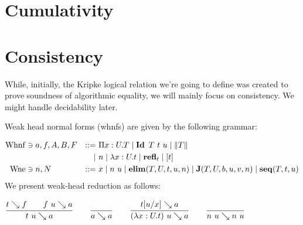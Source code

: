 \documentclass[a4paper,english]{lipics-utf8x}
\begin{document}
  \begin{mathc}
  \end{mathc}

  \section{Cumulativity}

  \begin{mathc}
    \qquad
  \end{mathc}

  \begin{mathc}
    \qquad
  \end{mathc}

  \section{Consistency}

  While, initially, the Kripke logical relation we're going to define was
  created to prove soundness of algorithmic equality, we will mainly focus
  on consistency. We might handle decidability later.


  Weak head normal forms (whnfs) are given by the following grammar:

  \begin{align*}
    \operatorname{Whnf} &\ni a,f,A,B,F &::=~& \Pi x:U.T \mid \operatorname{\mathbf{Id}~} T\ t\ u \mid \|T\| \\
        &&\mid~& n \mid \lambda x:U.t \mid \operatorname{\mathbf{refl}}_t \mid [t] \\
    \operatorname{Wne}  &\ni n,N &::=~& x \mid n~u \mid \operatorname{\mathbf{elim}}(T,U,t,u,n) \mid \operatorname{\mathbf{J}} (T,U,b,u,v,n)
                    \mid \operatorname{\mathbf{seq}}(T,t,u)
  \end{align*}
  We present weak-head reduction as follows:

  \begin{center}
  \(
    \ru{t \rew f \qquad
        f~u \rew a
      }{t~u \rew a}
    \qquad
    \ru{}{a \rew a}
    \qquad
    \ru{t[u/x] \rew a
      }{(\lambda x:U.t)~u \rew a}
    \qquad
    \ru{}{n~u \rew n~u}
  \)
  \end{center}
\end{document}
